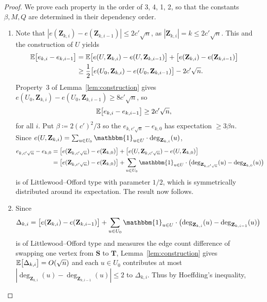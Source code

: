 \begin{proof}
  We prove each property in the order of 3, 4, 1, 2, so that the constants $\beta, M, Q$ are determined in their dependency order.

  \begin{enumerate}
    \item[3.] Note that $|e(\mathbf{Z}_{k, i}) - e(\mathbf{Z}_{k, i - 1})| \leq 2c'\sqrt{n}$, as $|\mathbf{Z}_{k, i}| = k \leq 2c'\sqrt{n}$. This and the construction of $U$ yields
    \begin{align*}
      \mathbb{E}\bigl[e_{k, i} - e_{k, i - 1}\bigr] 
      &= \mathbb{E}\bigl[e(U, \mathbf{Z}_{k, i}) - e(U, \mathbf{Z}_{k, i - 1})\bigr] + \bigl[e(\mathbf{Z}_{k, i}) - e(\mathbf{Z}_{k, i - 1})\bigr] \\
      &\geq \frac{1}{2}\bigl[e(U_0, \mathbf{Z}_{k, i}) - e(U_0, \mathbf{Z}_{k, i - 1})\bigr] - 2c'\sqrt{n}.
    \end{align*}
    Property~3 of Lemma~\ref{lem:construction} gives $e(U_0, \mathbf{Z}_{k, i}) - e(U_0, \mathbf{Z}_{k, i - 1}) \geq 8c'\sqrt{n}$, so 
    \[
      \mathbb{E}\bigl[e_{k, i} - e_{k, i - 1}\bigr]  \geq 2c'\sqrt{n},
    \]
    for all $i$. Put $\beta \coloneqq 2(c')^2/3$ so the $e_{k, c'\sqrt{n}} - e_{k, 0}$ has expectation $\geq 3\beta n$. Since $e(U, \mathbf{Z}_{k, i}) = \sum_{u \in U_0} \mathbbm{1}_{u \in U} \cdot \deg_{\mathbf{Z}_{k, i}}(u)$,
    \begin{align*}
      e_{k, c'\sqrt{n}} - e_{k, 0} 
      &= \bigl[e(\mathbf{Z}_{k, c'\sqrt{n}}) - e(\mathbf{Z}_{k, 0})\bigr] + \bigl[e(U, \mathbf{Z}_{k, c'\sqrt{n}}) - e(U, \mathbf{Z}_{k, 0})\bigr] \\
      &= \bigl[e(\mathbf{Z}_{k, c'\sqrt{n}}) - e(\mathbf{Z}_{k, 0})\bigr] + \sum_{u \in U_0} \mathbbm{1}_{u \in U} \cdot \bigl(\deg_{\mathbf{Z}_{k, c'\sqrt{n}}}(u) - \deg_{\mathbf{Z}_{k, 0}}(u)\bigr)
    \end{align*}
    is of Littlewood--Offord type with parameter $1/2$, which is symmetrically distributed around its expectation. The result now follows.
    \item[4.] Since 
    \[
      \Delta_{k, i} = \bigl[e(\mathbf{Z}_{k, i}) - e(\mathbf{Z}_{k, i - 1})\bigr] + \sum_{u \in U_0} \mathbbm{1}_{u \in U} \cdot \bigl(\deg_{\mathbf{Z}_{k, i}}(u) - \deg_{\mathbf{Z}_{k, i - 1}}(u)\bigr)
    \]
    is of Littlewood--Offord type and measures the edge count difference of swapping one vertex from $\mathbf{S}$ to $\mathbf{T}$, Lemma~\ref{lem:construction} gives $\mathbb{E}\bigl[\Delta_{k, i}\bigr] = O(\sqrt{n})$ and each $u \in U_0$ contributes at most $|\deg_{\mathbf{Z}_{k, i}}(u) - \deg_{\mathbf{Z}_{k, i - 1}}(u)| \leq 2$ to $\Delta_{k, i}$. Thus by Hoeffding's inequality,

\end{enumerate}
\end{proof}

